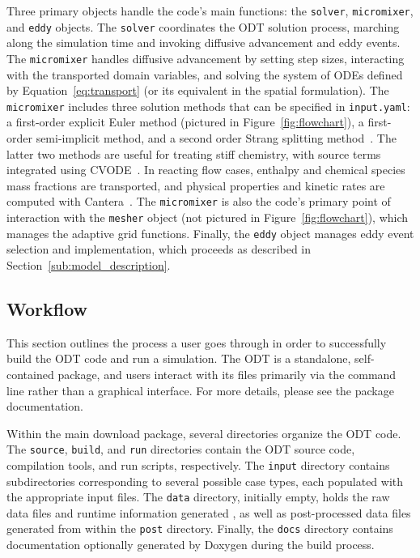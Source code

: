 \documentclass[preprint,12pt, a4paper]{elsarticle}
\begin{document}
Three primary objects handle the code's main functions: the \texttt{solver}, \texttt{micromixer}, and \texttt{eddy} objects. The \texttt{solver} coordinates the ODT solution process, marching along the simulation time and invoking diffusive advancement and eddy events. The \texttt{micromixer} handles diffusive advancement by setting step sizes, interacting with the transported domain variables, and solving the system of ODEs defined by Equation~\ref{eq:transport} (or its equivalent in the spatial formulation). The \texttt{micromixer} includes three solution methods that can be specified in \texttt{input.yaml}: a first-order explicit Euler method (pictured in Figure~\ref{fig:flowchart}), a first-order semi-implicit method, and a second order Strang splitting method~\cite{Strang_1968}. The latter two methods are useful for treating stiff chemistry, with source terms integrated using CVODE~\cite{Hindmarsh_2020}. In reacting flow cases, enthalpy and chemical species mass fractions are transported, and physical properties and kinetic rates are computed with Cantera~\cite{Goodwin_2018}. The \texttt{micromixer} is also the code's primary point of interaction with the \texttt{mesher} object (not pictured in Figure~\ref{fig:flowchart}), which manages the adaptive grid functions. Finally, the \texttt{eddy} object manages eddy event selection and implementation, which proceeds as described in Section~\ref{sub:model_description}.  

\subsection{Workflow}
\label{sub:workflow}

This section outlines the process a user goes through in order to successfully build the ODT code and run a simulation. The ODT  is a standalone, self-contained package, and users interact with its files primarily via the command line rather than a graphical interface. For more details, please see the package documentation.

Within the main download package, several directories organize the ODT code. The \texttt{source}, \texttt{build}, and \texttt{run} directories contain the ODT source code, compilation tools, and run scripts, respectively. The \texttt{input} directory contains subdirectories corresponding to several possible case types, each populated with the appropriate input files. The \texttt{data} directory, initially empty, holds the raw data files and runtime information generated , as well as post-processed data files generated from within the \texttt{post} directory. Finally, the \texttt{docs} directory contains documentation optionally generated by Doxygen \cite{vanHeesch_2018} during the build process. 
\end{document}
